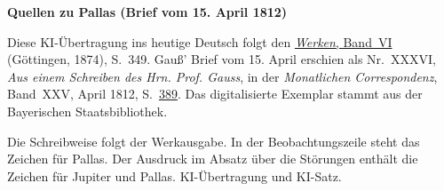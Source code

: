 \clearpage\thispagestyle{empty}
\begin{center}\textbf{Quellen zu Pallas (Brief vom 15. April 1812)}\end{center}
\noindent Diese KI-Übertragung ins heutige Deutsch folgt den \href{https://gdz.sub.uni-goettingen.de/id/PPN236007467}{\textit{Werken}, Band~VI} (Göttingen, 1874), S.~349. Gauß’ Brief vom 15. April erschien als Nr.~XXXVI, \textit{Aus einem Schreiben des Hrn. Prof. Gauss}, in der \textit{Monatlichen Correspondenz}, Band~XXV, April 1812, S.~\href{https://api.digitale-sammlungen.de/iiif/image/v2/bsb10538614_00403/full/1600,/0/default.jpg}{389}. Das digitalisierte Exemplar stammt aus der Bayerischen Staatsbibliothek.
\par\smallskip\noindent Die Schreibweise folgt der Werkausgabe. In der Beobachtungszeile steht das Zeichen für Pallas. Der Ausdruck im Absatz über die Störungen enthält die Zeichen für Jupiter und Pallas. KI-Übertragung und KI-Satz.
\clearpage
